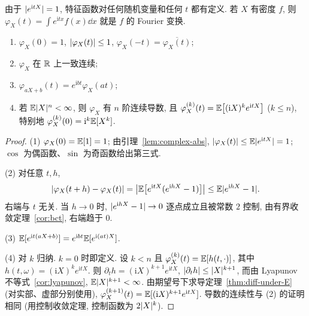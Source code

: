 由于 $\lvert e^{\mathrm{i}tX}\rvert=1$, 特征函数对任何随机变量和任何 $t$ 都有定义. 若 $X$ 有密度 $f$, 则 $\varphi_X(t)=\int e^{\mathrm{i}tx}f(x)\dd x$ 就是 $f$ 的 Fourier 变换.

\begin{theorem}[特征函数的基本性质]\label{thm:cf-properties}
\begin{enumerate}
\item $\varphi_X(0)=1$, $\lvert\varphi_X(t)\rvert\le1$, $\varphi_X(-t)=\overline{\varphi_X(t)}$;
\item $\varphi_X$ 在 $\mathbb{R}$ 上一致连续;
\item $\varphi_{aX+b}(t)=e^{\mathrm{i}bt}\varphi_X(at)$;
\item 若 $\mathbb{E}\lvert X\rvert^n<\infty$, 则 $\varphi_X$ 有 $n$ 阶连续导数, 且 $\varphi_X^{(k)}(t)=\mathbb{E}\big[(\mathrm{i}X)^ke^{\mathrm{i}tX}\big]$ ($k\le n$), 特别地 $\varphi_X^{(k)}(0)=\mathrm{i}^k\mathbb{E}[X^k]$.
\end{enumerate}
\end{theorem}

\begin{proof}
(1) $\varphi_X(0)=\mathbb{E}[1]=1$; 由引理~\ref{lem:complex-abs}, $\lvert\varphi_X(t)\rvert\le\mathbb{E}\lvert e^{\mathrm{i}tX}\rvert=1$; $\cos$ 为偶函数、$\sin$ 为奇函数给出第三式.

(2) 对任意 $t,h$,
\[
\lvert\varphi_X(t+h)-\varphi_X(t)\rvert=\big|\mathbb{E}\big[e^{\mathrm{i}tX}(e^{\mathrm{i}hX}-1)\big]\big|\le\mathbb{E}\lvert e^{\mathrm{i}hX}-1\rvert.
\]
右端与 $t$ 无关. 当 $h\to0$ 时, $\lvert e^{\mathrm{i}hX}-1\rvert\to0$ 逐点成立且被常数 $2$ 控制, 由有界收敛定理~\ref{cor:bct}, 右端趋于 $0$.

(3) $\mathbb{E}[e^{\mathrm{i}t(aX+b)}]=e^{\mathrm{i}bt}\mathbb{E}[e^{\mathrm{i}(at)X}]$.

(4) 对 $k$ 归纳. $k=0$ 时即定义. 设 $k<n$ 且 $\varphi_X^{(k)}(t)=\mathbb{E}[h(t,\cdot)]$, 其中 $h(t,\omega)=(\mathrm{i}X)^ke^{\mathrm{i}tX}$. 则 $\partial_t h=(\mathrm{i}X)^{k+1}e^{\mathrm{i}tX}$, $\lvert\partial_t h\rvert\le\lvert X\rvert^{k+1}$, 而由 Lyapunov 不等式~\ref{cor:lyapunov}, $\mathbb{E}\lvert X\rvert^{k+1}<\infty$. 由期望号下求导定理~\ref{thm:diff-under-E} (对实部、虚部分别使用), $\varphi_X^{(k+1)}(t)=\mathbb{E}[(\mathrm{i}X)^{k+1}e^{\mathrm{i}tX}]$. 导数的连续性与 (2) 的证明相同 (用控制收敛定理, 控制函数为 $2\lvert X\rvert^{k}$).
\end{proof}

